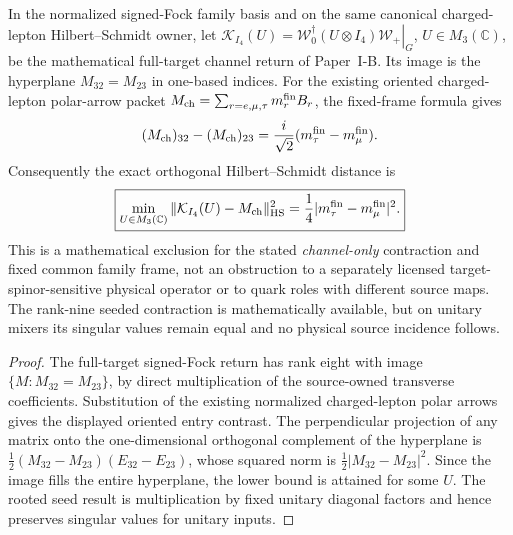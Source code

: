 \documentclass[12pt,a4paper]{article}
\begin{document}
\begin{proposition}
\label{p5:prop:charged-signed-return-distance}
In the normalized signed-Fock family basis and on the same
canonical charged-lepton Hilbert--Schmidt owner, let
\(\mathcal K_{I_4}(U)=\left.\mathcal W_0^\dagger(U\otimes I_4)
\mathcal W_+\right|_G\), \(U\in M_3(\mathbb C)\), be the
mathematical full-target channel return of Paper~I-B.
Its image is the hyperplane \(M_{32}=M_{23}\) in one-based indices.
For the existing oriented charged-lepton polar-arrow packet
\(M_{\rm ch}=\sum_{r=e,\mu,\tau}m_r^{\rm fin}B_r\), the fixed-frame
formula gives
\[
 (M_{\rm ch})_{32}-(M_{\rm ch})_{23}
 =\frac{i}{\sqrt2}(m_\tau^{\rm fin}-m_\mu^{\rm fin}).
\]
Consequently the exact orthogonal Hilbert--Schmidt distance is
\[
 \boxed{\min_{U\in M_3(\mathbb C)}
 \|\mathcal K_{I_4}(U)-M_{\rm ch}\|_{\rm HS}^2
 =\frac14|m_\tau^{\rm fin}-m_\mu^{\rm fin}|^2.}
\]
This is a mathematical exclusion for the stated \emph{channel-only}
contraction and fixed common family frame, not an obstruction to a
separately licensed target-spinor-sensitive physical operator or to
quark roles with different source maps. The rank-nine seeded
contraction is mathematically available, but on unitary mixers its
singular values remain equal and no physical source incidence follows.
\end{proposition}
\begin{proof}
The full-target signed-Fock return has rank eight with image
\(\{M:M_{32}=M_{23}\}\), by direct multiplication of the source-owned
transverse coefficients. Substitution of the existing normalized
charged-lepton polar arrows gives the displayed oriented entry
contrast. The perpendicular projection of any matrix onto the
one-dimensional orthogonal complement of the hyperplane is
\(\frac12(M_{32}-M_{23})(E_{32}-E_{23})\), whose squared norm is
\(\frac12|M_{32}-M_{23}|^2\). Since the image fills the entire
hyperplane, the lower bound is attained for some \(U\).
The rooted seed result is multiplication by fixed unitary diagonal
factors and hence preserves singular values for unitary inputs.
\end{proof}



\end{document}
